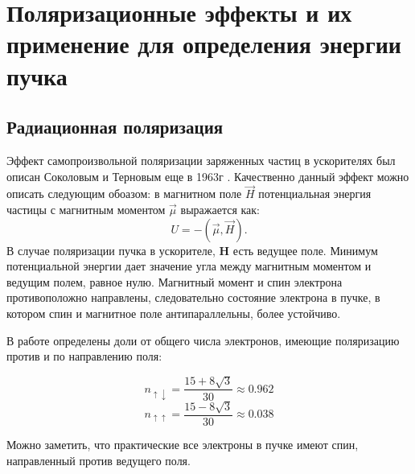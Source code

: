 \chapter{Поляризационные эффекты и их применение для определения энергии пучка}
\label{sec:respnant_dep}
\section{Радиационная поляризация}
Эффект самопроизвольной поляризации заряженных частиц в ускорителях был описан Соколовым и Терновым еще в 1963г \cite{SokolovTernov63}. Качественно данный эффект можно описать следующим обоазом: в магнитном поле $\vec{H}$ потенциальная энергия частицы с магнитным моментом  $\vec{\mu}$ выражается как: 
\begin{equation}
U = - (\vec{\mu}, \vec{H}).
\end{equation} 
В случае поляризации пучка в ускорителе, $\boldsymbol{H}$ есть ведущее поле. Минимум потенциальной энергии дает значение угла между магнитным моментом и ведущим полем, равное нулю. Магнитный момент и спин электрона противоположно направлены, следовательно состояние электрона в пучке, в котором спин и магнитное поле антипараллельны, более устойчиво.
\par В работе  \cite{sokolov} определены доли от общего числа электронов, имеющие поляризацию против и по направлению поля: 
\begin{multicols}{2}
	\noindent
	\begin{equation}
	n_{\uparrow\downarrow} = \frac{15+8\sqrt{3}}{30} \approx 0.962 
	\end{equation}
	\begin{equation}
	n_{\uparrow\uparrow} = \frac{15-8\sqrt{3}}{30} \approx 0.038
	\end{equation}
\end{multicols}
Можно заметить, что практические все электроны в пучке имеют спин, направленный против ведущего поля. 

